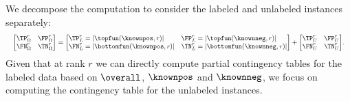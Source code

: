 


%


We decompose the computation to consider the labeled and unlabeled instances separately: 
\begin{equation*}
\resizebox{\textwidth}{!}{$
\begin{bmatrix}
\TP_{\Omega}^r & \FP_{\Omega}^r \\
\FN_{\Omega}^r & \TN_{\Omega}^r
\end{bmatrix} = 
\begin{bmatrix*}[l]
\TP_{L}^r = |\topfun(\knownpos, r)| & \FP_{L}^r = |\topfun(\knownneg, r)|\\
\FN_{L}^r = |\bottomfun(\knownpos, r)| & \TN_{L}^r = |\bottomfun(\knownneg, r)|
\end{bmatrix*}
+
\begin{bmatrix}
\TP_{U}^r & \FP_{U}^r\\
\FN_{U}^r & \TN_{U}^r
\end{bmatrix}$.}
\end{equation*}
Given that at rank $r$ we can directly compute partial contingency tables for the labeled data based on $\overall$, $\knownpos$ and $\knownneg$, we focus on computing the contingency table for the unlabeled instances. 

